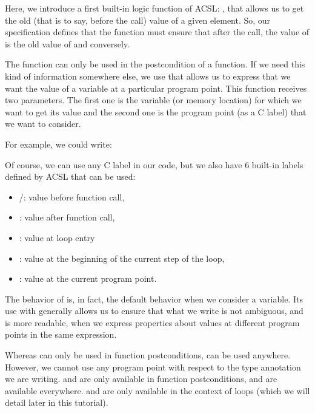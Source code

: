 

Here, we introduce a first built-in logic function of ACSL:
, that allows us to get the old (that
is to say, before the call) value of a given element. So, our specification
defines that the function must ensure that after the call, the value of
 is the old  value of  and conversely.

The  function can only be used in the
postcondition of a function. If we need this kind of information
somewhere else, we use  that allows us
to express that we want the value of a variable at a particular program
point. This function receives two parameters. The first one is the variable
(or memory location) for which we want to get its value and the second one
is the program point (as a C label) that we want to consider.

For example, we could write:






Of course, we can use any C label in our code, but we also have 6
built-in labels defined by ACSL that can be used:



\begin{itemize}
\item {}/: value before function call,
\item {}: value after function call,
\item {}: value at loop entry
\item {}: value at the beginning of the current step of
  the loop,
\item {}: value at the current program point.
\end{itemize}


\begin{Information}
  The behavior of  is, in fact, the default behavior when we
  consider a variable. Its use with 
  generally allows us to ensure that what we write is not ambiguous, and is more
  readable, when we express properties about values at different program
  points in the same expression.
\end{Information}


Whereas  can only be used in function
postconditions,  can be used anywhere.
However, we cannot use any program point with respect to the type
annotation we are writing.  and  are only
available in function postconditions,  and 
are available everywhere.  and 
are only available in the context of loops (which we will detail later
in this tutorial).



